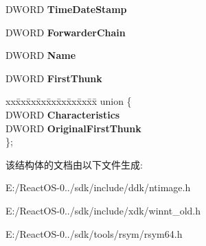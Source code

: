 \begin{DoxyCompactItemize}
\begin{tabbing}
\end{tabbing}\item 
\mbox{\label{struct___i_m_a_g_e___i_m_p_o_r_t___d_e_s_c_r_i_p_t_o_r_a554b244da48b8fcf554b7a53ab6944ee}} 
D\+W\+O\+RD {\bfseries Time\+Date\+Stamp}
\item 
\mbox{\label{struct___i_m_a_g_e___i_m_p_o_r_t___d_e_s_c_r_i_p_t_o_r_aac21b59892bc33407c0a4116a239029f}} 
D\+W\+O\+RD {\bfseries Forwarder\+Chain}
\item 
\mbox{\label{struct___i_m_a_g_e___i_m_p_o_r_t___d_e_s_c_r_i_p_t_o_r_ae076d58478aa4f7e4450f5bf85c84f03}} 
D\+W\+O\+RD {\bfseries Name}
\item 
\mbox{\label{struct___i_m_a_g_e___i_m_p_o_r_t___d_e_s_c_r_i_p_t_o_r_a9dc50f4715432ad4d3b568f491301dba}} 
D\+W\+O\+RD {\bfseries First\+Thunk}
\item 
\mbox{\label{struct___i_m_a_g_e___i_m_p_o_r_t___d_e_s_c_r_i_p_t_o_r_a31b6526d7fe03ba44612895e223b5c30}} 
\begin{tabbing}
xx\=xx\=xx\=xx\=xx\=xx\=xx\=xx\=xx\=\kill
union \{\\
\>DWORD {\bfseries Characteristics}\\
\>DWORD {\bfseries OriginalFirstThunk}\\
\}; \\

\end{tabbing}\end{DoxyCompactItemize}


该结构体的文档由以下文件生成\+:\begin{DoxyCompactItemize}
\item 
E\+:/\+React\+O\+S-\/0../sdk/include/ddk/ntimage.\+h\item 
E\+:/\+React\+O\+S-\/0../sdk/include/xdk/winnt\+\_\+old.\+h\item 
E\+:/\+React\+O\+S-\/0../sdk/tools/rsym/rsym64.\+h\end{DoxyCompactItemize}
